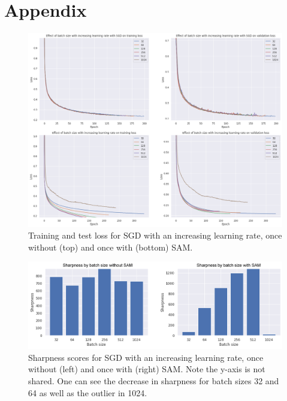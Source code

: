 \documentclass[10pt,conference,compsocconf]{IEEEtran}
\begin{document}
\newpage



\newpage

\section*{Appendix}
\label{sec:appendix}

\begin{figure}[htbp]
  \centering
  \includegraphics[width=\columnwidth]{img/figure1_val_loss_with_without_sam_sgd}
  \caption{Training and test loss for SGD with an increasing learning rate, once without (top) and once with (bottom) SAM.}
  \vspace{-3mm}
  \label{fig:val-loss-with-without}
\end{figure}
\begin{figure}[htbp]
  \centering
  \includegraphics[width=\columnwidth]{img/figure2_sharpness_with_without_sam_sgd}
  \caption{Sharpness scores for SGD with an increasing learning rate, once without (left) and once with (right) SAM. Note the y-axis is not shared. One can see the decrease in sharpness for batch sizes 32 and 64 as well as the outlier in 1024.}
  \vspace{-3mm}
  \label{fig:sharpness-with-without}
\end{figure}
\end{document}
